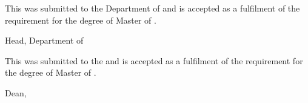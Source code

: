 \documentclass[12pt, a4paper, oneside]{memoir}
\begin{document}
\ifdefined\myDepartmentHead
  \noindent This \myDocument was submitted to the Department of \myDepartment and is accepted as a fulfilment of the requirement for the degree of Master of \mySubject.\\[18pt]

  \hfill \makebox[2in]{\dotfill}

  \hfill \myDepartmentHead

  \hfill Head, Department of \myDepartment\\[6pt]
\fi

\ifdefined\myCoSupervisor
  \ifdefined\myExaminer
    \newpage
  \fi
\fi

\noindent This \myDocument was submitted to the \myKulliyyah and 
is accepted as a fulfilment of the requirement for the degree of Master of 
\mySubject.\\[18pt]

\hfill \makebox[2in]{\dotfill}

\hfill \myKulliyahDean

\hfill Dean, \myKulliyyah\\
\end{document}
